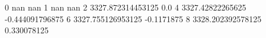 0 nan nan
1 nan nan
2 3327.872314453125 0.0
4 3327.42822265625 -0.444091796875
6 3327.755126953125 -0.1171875
8 3328.202392578125 0.330078125
